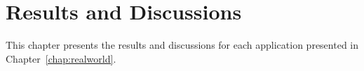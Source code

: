 \chapter{Results and Discussions} \label{chap:results}

This chapter presents the results and discussions for each application presented in Chapter~\ref{chap:realworld}.



\newpage


\newpage
